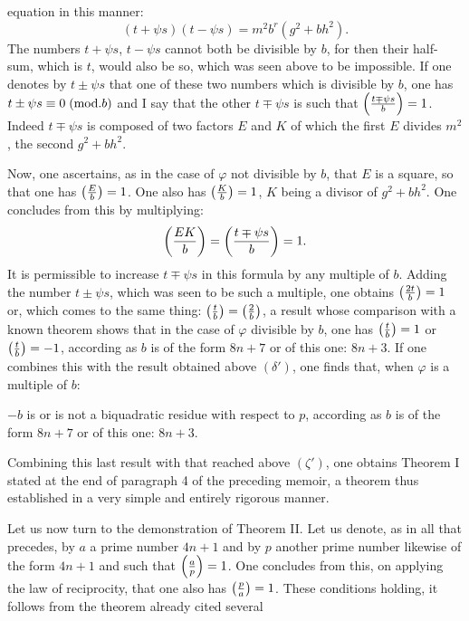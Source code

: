 \noindent
equation in this manner:
\[
(t+\psi s)(t-\psi s)=m^2b^r(g^2+bh^2).
\]
The numbers $t+\psi s$, $t-\psi s$ cannot both be divisible by $b$,
for then their half-sum, which is $t$, would also be so, which was seen above
to be impossible. If one denotes by $t\pm\psi s$ that one of these two numbers which is
divisible by $b$, one has $t\pm\psi s\equiv0\;(\mathrm{mod}.b)$ and I say that the other $t\mp\psi s$ is such
that $\left(\frac{t\mp\psi s}{b}\right)=1$. Indeed $t\mp\psi s$ is composed of two factors $E$ and $K$ of which
the first $E$ divides $m^2$, the second $g^2+bh^2$.
\par\indent
Now, one ascertains, as in the case of $\varphi$ not divisible by $b$, that $E$
is a square, so that one has $\left(\frac{E}{b}\right)=1$. One also has $\left(\frac{K}{b}\right)=1$, $K$ being a divisor
of $g^2+bh^2$. One concludes from this by multiplying:
\[
\left(\frac{EK}{b}\right)=\left(\frac{t\mp\psi s}{b}\right)=1.
\]
It is permissible to increase $t\mp\psi s$ in this formula by any multiple
of $b$. Adding the number $t\pm\psi s$, which was seen to be such a multiple, one obtains
$\left(\frac{2t}{b}\right)=1$ or, which comes to the same thing: $\left(\frac{t}{b}\right)=\left(\frac{2}{b}\right)$, a result whose comparison
with a known theorem shows that in the case of $\varphi$ divisible by $b$,
one has $\left(\frac{t}{b}\right)=1$ or $\left(\frac{t}{b}\right)=-1$, according as $b$ is of the form $8n+7$ or of
this one: $8n+3$. If one combines this with the result obtained above $(\delta')$,
one finds that, when $\varphi$ is a multiple of $b$:
\par\noindent\hspace*{.06\linewidth}\begin{minipage}{.94\linewidth}
$-b$ is or is not a biquadratic residue with respect to $p$, according as $b$
is of the form $8n+7$ or of this one: $8n+3$.
\end{minipage}
\par\indent
Combining this last result with that reached
above $(\zeta')$, one obtains Theorem I stated at the end of paragraph 4 of the preceding
memoir, a theorem thus established in a very simple
and entirely rigorous manner.
\par\indent
Let us now turn to the demonstration of Theorem II. Let us denote,
as in all that precedes, by $a$ a prime number $4n+1$ and
by $p$ another prime number likewise of the form $4n+1$ and such that
$\left(\frac{a}{p}\right)=1$. One concludes from this, on applying the law of reciprocity, that one also has
$\left(\frac{p}{a}\right)=1$. These conditions holding, it follows from the theorem already cited several

